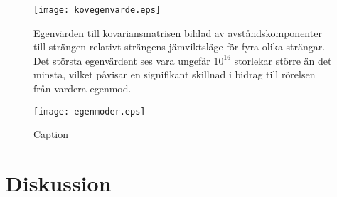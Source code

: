 \begin{figure}
    \centering
    \texttt{[image: kovegenvarde.eps]}
    \caption{Egenvärden till kovariansmatrisen bildad av avståndskomponenter till strängen relativt strängens jämviktsläge för fyra olika strängar. Det största egenvärdent ses vara ungefär $10^{16}$ storlekar större än det minsta, vilket påvisar en signifikant skillnad i bidrag till rörelsen från vardera egenmod.}
    \label{fig:kovegenvarde}
\end{figure}

\begin{figure}
    \centering
    \texttt{[image: egenmoder.eps]}
    \caption{Caption}
    \label{fig:egenmoder}
\end{figure}





\section{Diskussion}




